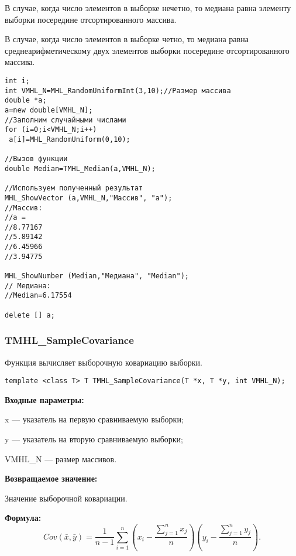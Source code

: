 \documentclass[a4paper,12pt]{article}
\begin{document}
В случае, когда число элементов в выборке нечетно, то медиана равна элементу выборки посередине отсортированного массива.

В случае, когда число элементов в выборке четно, то медиана равна среднеарифметическому двух элементов выборки посередине отсортированного массива.



\begin{lstlisting}[label=code_use_TMHL_Median,caption=Пример использования]
int i;
int VMHL_N=MHL_RandomUniformInt(3,10);//Размер массива
double *a;
a=new double[VMHL_N];
//Заполним случайными числами
for (i=0;i<VMHL_N;i++)
 a[i]=MHL_RandomUniform(0,10);

//Вызов функции
double Median=TMHL_Median(a,VMHL_N);

//Используем полученный результат
MHL_ShowVector (a,VMHL_N,"Массив", "a");
//Массив:
//a =
//8.77167
//5.89142
//6.45966
//3.94775

MHL_ShowNumber (Median,"Медиана", "Median");
// Медиана:
//Median=6.17554

delete [] a;
\end{lstlisting}

\subsubsection{TMHL\_SampleCovariance}\label{TMHL_SampleCovariance}

Функция вычисляет выборочную ковариацию выборки.


\begin{lstlisting}[label=code_syntax_TMHL_SampleCovariance,caption=Синтаксис]
template <class T> T TMHL_SampleCovariance(T *x, T *y, int VMHL_N);
\end{lstlisting}

\textbf{Входные параметры:}
 
x --- указатель на первую сравниваемую выборки;
 
y --- указатель на вторую сравниваемую выборки;
 
VMHL\_N --- размер массивов.

\textbf{Возвращаемое значение:}
 
Значение выборочной ковариации.

\textbf{Формула:}
\begin{equation*}
Cov\left(\bar{x},\bar{y} \right)= \dfrac{1}{n-1}\sum_{i=1}^{n} \left( x_i-\dfrac{\sum_{j=1}^{n}x_j}{n}\right)\left( y_i-\dfrac{\sum_{j=1}^{n}y_j}{n}\right) .
\end{equation*}
\end{document}

